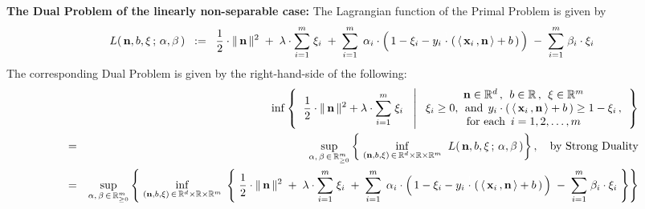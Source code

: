 \vskip 0.5cm
\noindent
\textbf{The Dual Problem of the linearly non-separable case:}
\vskip 0.1cm
\noindent
The Lagrangian function of the Primal Problem is given by
\begin{equation*}
L(\,\mathbf{n},b,\xi\,;\,\alpha,\beta\,)
\;\; := \;\;
	\dfrac{1}{2}\cdot\Vert\,\mathbf{n}\,\Vert^{2}
	\; + \;
	\lambda\cdot\overset{m}{\underset{i=1}{\sum}}\;\xi_{i}
	\; + \;
	\overset{m}{\underset{i = 1}{\sum}}\;\,
		\alpha_{i}
		\cdot
		\left(\,
			1 - \xi_{i}
			-
			y_{i}\overset{{\color{white}1}}{\cdot}\left(\,
				\langle\,\mathbf{x}_{i}\,,\mathbf{n}\,\rangle + b
				\,\right)
			\,\right)
	\; - \;
	\overset{m}{\underset{i = 1}{\sum}}\;
		\beta_{i}
		\cdot
		\xi_{i}
\end{equation*}
The corresponding Dual Problem is given by the right-hand-side of the following:
\begin{eqnarray*}
&&
	\inf
	\left\{\;\;
		\dfrac{1}{2}\cdot\Vert\,\mathbf{n}\,\Vert^{2}
		+
		\lambda\cdot\overset{m}{\underset{i=1}{\sum}}\;\xi_{i}
		\;\;\,\left\vert\;
		\begin{array}{c}
			\mathbf{n} \in \Re^{d} \,,\;\, b \in \Re \,,\;\, \xi \in \Re^{m}
			\\
			\xi_{i} \geq 0,\;\,\textnormal{and}\;\,
			y_{i}\cdot\left(\,\langle\,\mathbf{x}_{i}\,,\mathbf{n}\,\rangle + b\,\right) \geq 1 - \xi_{i}\,,
			\\
			\textnormal{for each \,$i = 1,2,\ldots,m$}
			\end{array}
			\right.
		\right\}
\\
& = &
	\underset{\alpha,\,\beta\,\in\,\Re_{\geq 0}^{m}}{\sup}
	\left\{\;
		\underset{(\mathbf{n},b,\xi)\,\in\,\Re^{d}\times\Re\times\Re^{m}}{\inf}\;\;
		L(\,\mathbf{n},b,\xi\,;\,\alpha,\beta\,)
		\right\},
	\quad
	\textnormal{by Strong Duality}
\\
& = &
	\underset{\alpha,\,\beta\,\in\,\Re_{\geq 0}^{m}}{\sup}
	\left\{\;
		\underset{(\mathbf{n},b,\xi)\,\in\,\Re^{d}\times\Re\times\Re^{m}}{\inf}\;
		\left\{\;
			\dfrac{1}{2}\cdot\Vert\,\mathbf{n}\,\Vert^{2}
			\; + \;
			\lambda\cdot\overset{m}{\underset{i=1}{\sum}}\;\xi_{i}
			\; + \;
			\overset{m}{\underset{i = 1}{\sum}}\;\,
				\alpha_{i}
				\cdot
				\left(\,
					1 - \xi_{i}
					-
					y_{i}\overset{{\color{white}1}}{\cdot}\left(\,
						\langle\,\mathbf{x}_{i}\,,\mathbf{n}\,\rangle + b
						\,\right)
					\,\right)
			\; - \;
			\overset{m}{\underset{i = 1}{\sum}}\;
				\beta_{i}
				\cdot
				\xi_{i}
			\;\right\}
		\right\}
\end{eqnarray*}
